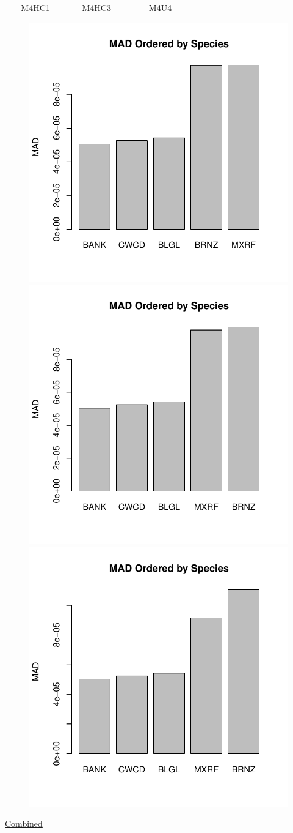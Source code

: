 \documentclass[ xcolor = pdftex, dvipsnames, table ]{beamer}
\begin{document}
%
\begin{frame}{$~~~~~~~$ \href{https://github.com/gasduster99/sppComp/tree/master/sscRuns/25019781982M4HC1}{M4HC1} $~~~~~~~~~~~~~~$ \href{https://github.com/gasduster99/sppComp/tree/master/sscRuns/25019781982M4HC3}{M4HC3} $~~~~~~~~~~~~~~~~~$ \href{https://github.com/gasduster99/sppComp/tree/master/sscRuns/25019781982M4U4}{M4U4} }
        \begin{figure}[ht!]
        \centering
        \hspace*{-1cm}
        \includegraphics[width=.4\textwidth]{../sscRuns/25019781982M4HC1/sppTailMad68.pdf}
        \includegraphics[width=.4\textwidth]{../sscRuns/25019781982M4HC3/sppTailMad68.pdf}
        \includegraphics[width=.4\textwidth]{../sscRuns/25019781982M4U4/sppTailMad68.pdf}
        \end{figure}
	\vspace{-1cm}
	\begin{center}
	\Large
	\href{https://github.com/gasduster99/sppComp/tree/master/try1/postSSC/25019781982M4HC1HC3U4}{Combined}
	\end{center}
\end{frame}
\end{document}
